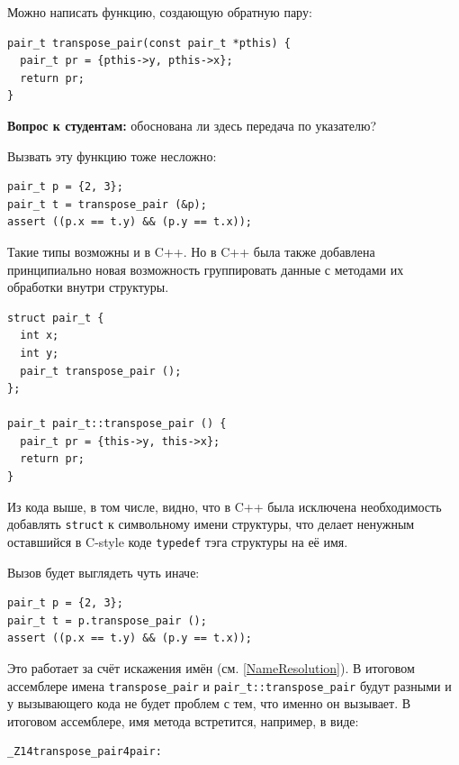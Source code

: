 \documentclass[a4paper,12pt,oneside]{book}
\newif\ifanswers
\begin{document}
\ifanswers
Правильный ответ: это стандартная идиома, чтобы в коде на C не писать лишний раз \lstinline!struct pair! в два слова.
\fi

Можно написать функцию, создающую обратную пару:

\begin{lstlisting}
pair_t transpose_pair(const pair_t *pthis) {
  pair_t pr = {pthis->y, pthis->x};
  return pr;
} 
\end{lstlisting}

\textbf{Вопрос к студентам:} обоснована ли здесь передача по указателю?

\ifanswers
Правильный ответ: на грани. Указатель может занимать больше места, чем два целых, может и меньше.
\fi

Вызвать эту функцию тоже несложно:

\begin{lstlisting}
pair_t p = {2, 3};
pair_t t = transpose_pair (&p);
assert ((p.x == t.y) && (p.y == t.x));
\end{lstlisting}

Такие типы возможны и в C++. Но в C++ была также добавлена принципиально новая возможность группировать данные с методами их обработки внутри структуры.

\begin{lstlisting}
struct pair_t { 
  int x; 
  int y;
  pair_t transpose_pair (); 
};

pair_t pair_t::transpose_pair () {
  pair_t pr = {this->y, this->x};
  return pr;
} 
\end{lstlisting}

Из кода выше, в том числе, видно, что в C++ была исключена необходимость добавлять \lstinline!struct! к символьному имени структуры, что делает ненужным оставшийся в C-style коде \lstinline!typedef! тэга структуры на её имя.

Вызов будет выглядеть чуть иначе:

\begin{lstlisting}
pair_t p = {2, 3};
pair_t t = p.transpose_pair ();
assert ((p.x == t.y) && (p.y == t.x));
\end{lstlisting}

Это работает за счёт искажения имён (см. \ref{NameResolution}). В итоговом ассемблере имена \lstinline!transpose_pair! и \lstinline!pair_t::transpose_pair! будут разными и у вызывающего кода не будет проблем с тем, что именно он вызывает. В итоговом ассемблере, имя метода встретится, например, в виде:

\begin{verbatim}
_Z14transpose_pair4pair:
\end{verbatim}
\end{document}
